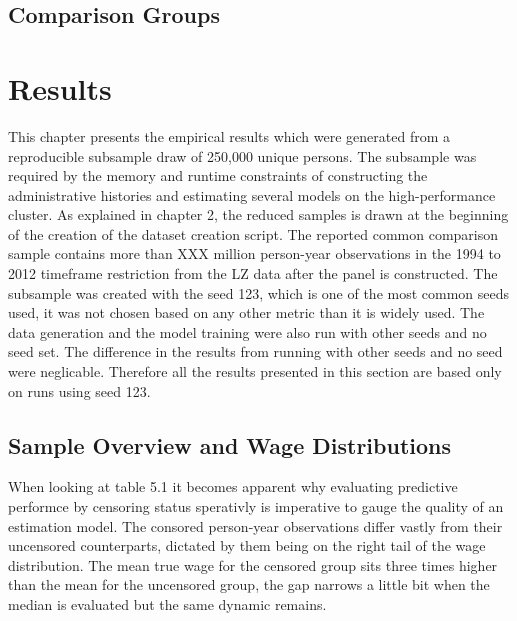 \documentclass[12pt,a4paper,oneside,titlepage]{book}
\newif\ifthesisdraft
\newcommand{\draftnote}[1]{%
  \ifthesisdraft
    \par\noindent\colorbox{yellow!20}{%
      \parbox{0.94\textwidth}{\textbf{Draft note:} #1}%
    }\par
  \fi
}
\begin{document}
\section{Comparison Groups}
\draftnote{Report all, censored, and uncensored observations separately. The censored group is central for judging de-censoring performance.}

\chapter{Results}
\label{ch:results}

This chapter presents the empirical results which were generated from a reproducible subsample draw of 250,000 unique persons. The subsample was required by the memory and runtime constraints of constructing the administrative histories and estimating several models on the high-performance cluster. As explained in chapter 2, the reduced samples is drawn at the beginning of the creation of the dataset creation script. The reported common comparison sample
contains more than XXX million person-year observations in the 1994 to 2012 timeframe restriction from the LZ data after the panel is constructed. The subsample was created with the seed 123, which is one of the most common seeds used, it was not chosen based on any other metric than it is widely used. The data generation and the model training were also run with other seeds and no seed set. The difference in the results from running with other seeds and no seed were neglicable. Therefore all the results presented in this section are based only on runs using seed 123.

\section{Sample Overview and Wage Distributions}
\draftnote{Begin with the descriptive evidence showing where BG and LZ wages agree and where top-coding creates a gap.}

When looking at table 5.1 it becomes apparent why evaluating predictive performce by censoring status sperativly is imperative to gauge the quality of an estimation model. The consored person-year observations differ vastly from their uncensored counterparts, dictated by them being on the right tail of the wage distribution. The mean true wage for the censored group sits three times higher than the mean for the uncensored group, the gap narrows a little bit when the median is evaluated but the same dynamic remains.
\end{document}

